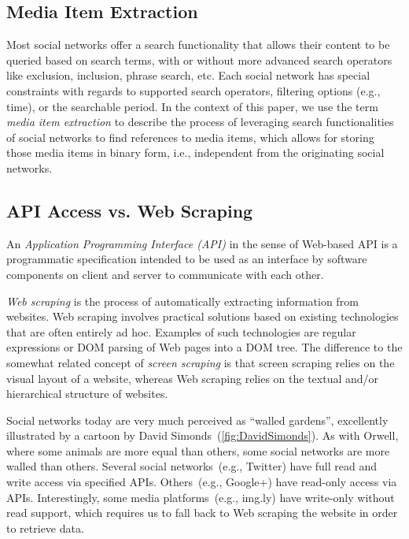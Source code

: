\documentclass{acm_proc_article-sp}
\let\oldemph\emph
\renewcommand{\emph}[1]{\oldemph{\fontsize{9}{9}\selectfont #1}}
\begin{document}
\subsection{Media Item Extraction}
Most social networks offer a search functionality that allows their content to be queried based on search terms,
with or without more advanced search operators like exclusion, inclusion, phrase search, etc.
Each social network has special constraints with regards to supported search operators,
filtering options (e.g., time), or the searchable period.
In the context of this paper, we use the term \emph{media item extraction} to describe the process of leveraging search functionalities of social networks to find references to media items,
which allows for storing those media items in binary form,
i.e., independent from the originating social networks.

\subsection{API Access vs. Web Scraping}
An \emph{Application Programming Interface (API)} in the sense of Web-based API is a programmatic specification intended to be used as an interface by software components on client and server to communicate with each other.

\emph{Web scraping} is the process of automatically extracting information from websites.
Web scraping involves practical solutions based on existing technologies that are often entirely ad hoc.
Examples of such technologies are regular expressions or DOM parsing of Web pages into a DOM tree.
The difference to the somewhat related concept of \emph{screen scraping} is that screen scraping relies on the visual layout of a website, whereas Web scraping relies on the textual and/or hierarchical structure of websites.

Social networks today are very much perceived as ``walled gardens'', excellently illustrated by a cartoon by David Simonds~(\autoref{fig:DavidSimonds}).
As with Orwell, where some animals are more equal than others, some social networks are more walled than others.
Several social networks~(e.g., Twitter) have full read and write access via specified APIs.
Others~(e.g., Google+) have read-only access via APIs.
Interestingly, some media platforms~(e.g., img.ly) have write-only without read support, which requires us to fall back to Web scraping the website in order to retrieve data.
\end{document}
